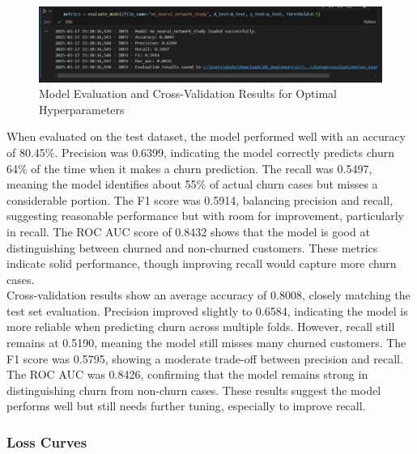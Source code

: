 \begin{figure}[hbt!]
    \centering
    \includegraphics[width=1\linewidth]{Images/5.7.1.a.jpg}
    \caption{Model Evaluation and Cross-Validation Results for Optimal Hyperparameters}
    \label{fig:enter-label}
\end{figure}

When evaluated on the test dataset, the model performed well with an accuracy of 80.45\%. Precision was 0.6399, indicating the model correctly predicts churn 64\% of the time when it makes a churn prediction. The recall was 0.5497, meaning the model identifies about 55\% of actual churn cases but misses a considerable portion. The F1 score was 0.5914, balancing precision and recall, suggesting reasonable performance but with room for improvement, particularly in recall. The ROC AUC score of 0.8432 shows that the model is good at distinguishing between churned and non-churned customers. These metrics indicate solid performance, though improving recall would capture more churn cases.\\

Cross-validation results show an average accuracy of 0.8008, closely matching the test set evaluation. Precision improved slightly to 0.6584, indicating the model is more reliable when predicting churn across multiple folds. However, recall still remains at 0.5190, meaning the model still misses many churned customers. The F1 score was 0.5795, showing a moderate trade-off between precision and recall. The ROC AUC was 0.8426, confirming that the model remains strong in distinguishing churn from non-churn cases. These results suggest the model performs well but still needs further tuning, especially to improve recall.

\subsubsection{Loss Curves}

